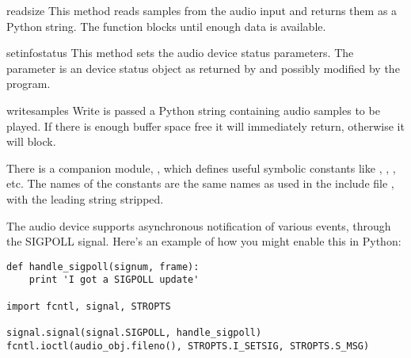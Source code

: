 \begin{methoddesc}{read}{size}
This method reads  samples from the audio input and returns
them as a Python string. The function blocks until enough data is available.
\end{methoddesc}

\begin{methoddesc}{setinfo}{status}
This method sets the audio device status parameters. The 
parameter is an device status object as returned by  and
possibly modified by the program.
\end{methoddesc}

\begin{methoddesc}{write}{samples}
Write is passed a Python string containing audio samples to be played.
If there is enough buffer space free it will immediately return,
otherwise it will block.
\end{methoddesc}

There is a companion module,
, which defines useful
symbolic constants like , ,
, etc. The names of the constants are the same names
as used in the \C{} include file , with the
leading string  stripped.

The audio device supports asynchronous notification of various events,
through the SIGPOLL signal.  Here's an example of how you might enable 
this in Python:

\begin{verbatim}
def handle_sigpoll(signum, frame):
    print 'I got a SIGPOLL update'

import fcntl, signal, STROPTS

signal.signal(signal.SIGPOLL, handle_sigpoll)
fcntl.ioctl(audio_obj.fileno(), STROPTS.I_SETSIG, STROPTS.S_MSG)
\end{verbatim}
